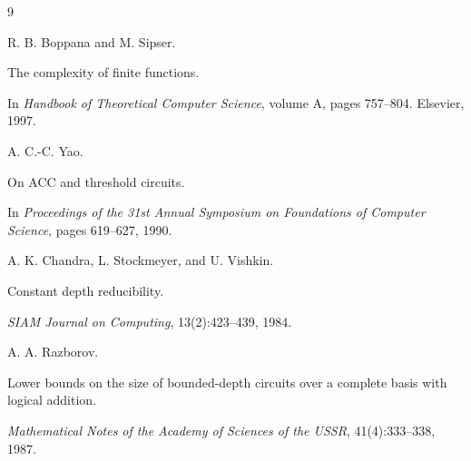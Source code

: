 \begin{thebibliography}{9}






R. B. Boppana and M. Sipser.






The complexity of finite functions.






In \textit{Handbook of Theoretical Computer Science}, volume A, pages 757–804. Elsevier, 1997.



















A. C.-C. Yao.






On ACC and threshold circuits.






In \textit{Proceedings of the 31st Annual Symposium on Foundations of Computer Science}, pages 619–627, 1990.



















A. K. Chandra, L. Stockmeyer, and U. Vishkin.






Constant depth reducibility.






\textit{SIAM Journal on Computing}, 13(2):423–439, 1984.



















A. A. Razborov.






Lower bounds on the size of bounded-depth circuits over a complete basis with logical addition.






\textit{Mathematical Notes of the Academy of Sciences of the USSR}, 41(4):333–338, 1987.






\end{thebibliography}